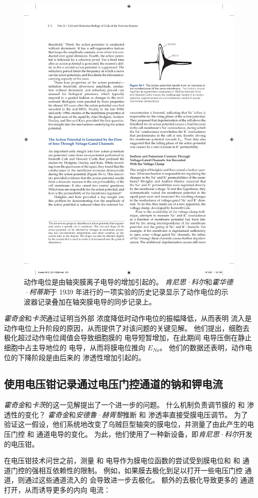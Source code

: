 \begin{figure}[htbp]
	\centering
	\includegraphics[width=0.5\linewidth]{chap10/fig_10_1}
	\caption{动作电位是由轴突膜离子电导的增加引起的。
		\textit{肯尼思·科尔}和\textit{霍华德·柯蒂斯}于 1939 年进行的一项实验的历史记录显示了动作电位的示波器记录叠加在轴突膜电导的同步记录上。}
	\label{fig:10_1}
\end{figure}


\textit{霍奇金}和\textit{卡茨}通过证明当外部  浓度降低时动作电位的振幅降低，从而表明  流入是动作电位上升阶段的原因，从而提供了对该问题的关键见解。
他们提出，细胞去极化超过动作电位阈值会导致细胞膜的  电导短暂增加，在此期间  电导压倒在静止细胞中占主导地位的  电导，从而将膜电位推向 $E_{Na}$。 
他们的数据还表明，动作电位的下降阶段是由后来的  渗透性增加引起的。



\subsection{使用电压钳记录通过电压门控通道的钠和钾电流}

\textit{霍奇金}和\textit{卡茨}的这一见解提出了一个进一步的问题。
什么机制负责调节膜的  和  渗透性的变化？
\textit{霍奇金}和\textit{安德鲁·赫胥黎}推断  和  渗透率直接受膜电压调节。
为了验证这一假设，他们系统地改变了乌贼巨型轴突的膜电位，并测量了由此产生的电压门控  和  通道电导的变化。
为此，他们使用了一种新设备，即\textit{肯尼思·科尔}开发的电压钳。


在电压钳技术问世之前，测量  和  电导作为膜电位函数的尝试受到膜电位和  和  通道门控的强相互依赖性的限制。
例如，如果膜去极化到足以打开一些电压门控  通道，则通过这些通道流入的  会导致进一步去极化。 
额外的去极化导致更多的  通道打开，从而诱导更多的内向  电流：


